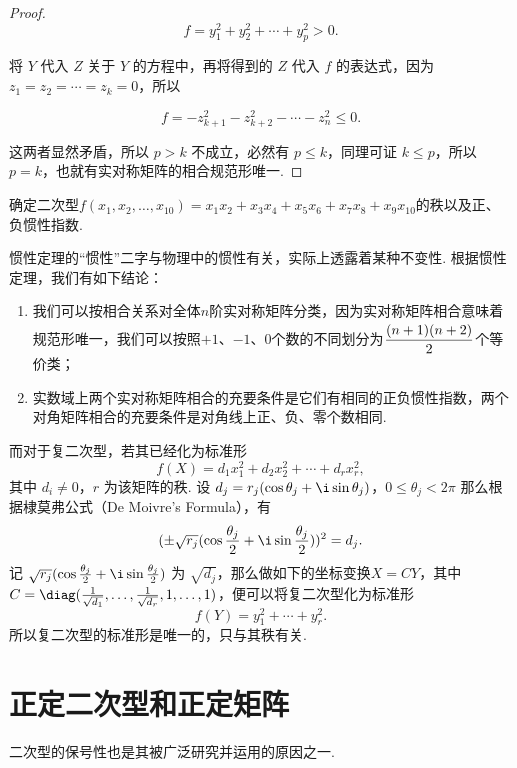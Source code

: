 \begin{proof}
    \[
        f = y_1^2 + y_2^2 + \cdots + y_p^2 > 0.
    \]

    将 $Y$ 代入 $Z$ 关于 $Y$ 的方程中，再将得到的 $Z$ 代入 $f$ 的表达式，因为 $z_1 = z_2 = \cdots = z_k = 0$，所以

    \[
        f = -z_{k + 1}^2 - z_{k + 2}^2 - \cdots - z_n^2 \leqslant 0.
    \]

    这两者显然矛盾，所以 $p > k$ 不成立，必然有 $p \leqslant k$，同理可证 $k \leqslant p$，所以 $p = k$，也就有实对称矩阵的相合规范形唯一.

\end{proof}

\begin{example}{}{}
    确定二次型$f(x_1,x_2,\ldots,x_{10})=x_1x_2+x_3x_4+x_5x_6+x_7x_8+x_9x_{10}$的秩以及正、负惯性指数.
\end{example}

惯性定理的``惯性''二字与物理中的惯性有关，实际上透露着某种不变性. 根据惯性定理，我们有如下结论：
\begin{enumerate}
    \item 我们可以按相合关系对全体$n$阶实对称矩阵分类，因为实对称矩阵相合意味着规范形唯一，我们可以按照$+1$、$-1$、0个数的不同划分为$\vphantom{\cfrac{n+1}{2}}\dfrac{(n+1)(n+2)}{2}$个等价类；

    \item 实数域上两个实对称矩阵相合的充要条件是它们有相同的正负惯性指数，两个对角矩阵相合的充要条件是对角线上正、负、零个数相同.
\end{enumerate}

而对于复二次型，若其已经化为标准形
\[
    f(X) = d_1x_1^2 + d_2x_2^2 + \cdots + d_rx_r^2,
\]
其中 $d_i \neq 0$，$r$ 为该矩阵的秩. 设 $d_j = r_j(\cos \theta_j + \i \sin \theta_j)$，$0 \leqslant \theta_j < 2 \pi$ 那么根据棣莫弗公式（De Moivre's Formula），有
\[
    (\pm \sqrt{r_j}(\cos \frac{\theta_j}{2} + \i \sin \frac{\theta_j}{2}))^2 = d_j.
\]
记 $\sqrt{r_j}(\cos \frac{\theta_j}{2} + \i \sin \frac{\theta_j}{2})$ 为 $\sqrt{d_j}$，那么做如下的坐标变换$X=CY$，其中 $C = \diag(\frac{1}{\sqrt{d_1}}, \ldots, \frac{1}{\sqrt{d_r}}, 1, \ldots, 1)$，便可以将复二次型化为标准形
\[
    f(Y) = y_1^2 + \cdots + y_r^2.
\]
所以复二次型的标准形是唯一的，只与其秩有关.

\section{正定二次型和正定矩阵}

二次型的保号性也是其被广泛研究并运用的原因之一.

